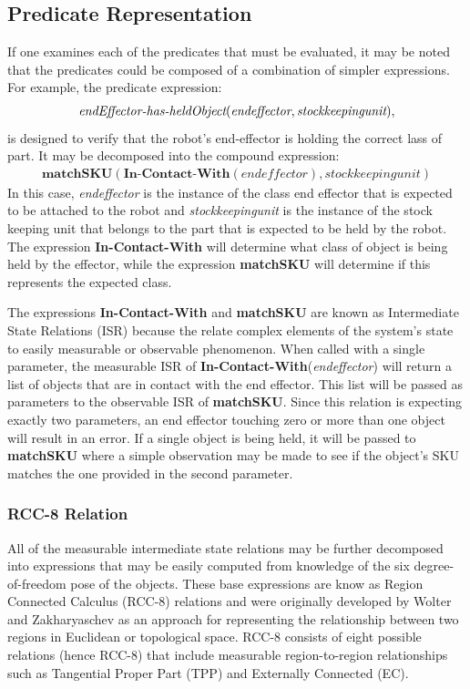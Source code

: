 \subsection{Predicate Representation}
If one examines each of the predicates that must be evaluated, it may be
noted that the predicates could be composed of a combination of simpler 
expressions. For example, the predicate expression:
\begin{gather} 
\textit{endEffector-has-heldObject}(\textit{endeffector}, 
\textit{stockkeepingunit}),
\label{equation:endEffector-has-heldObject}
\end{gather}
is designed to verify that the robot's end-effector is holding the correct lass of part. It may be decomposed into the compound expression: 
\begin{gather}
\textbf{matchSKU}(\textbf{In-Contact-With}(\textit{endeffector}), stockkeepingunit)
\label{equation:matchSKU}
\end{gather}
In this case, \textit{endeffector} is the instance of the class end effector
that is expected to be attached to the robot
and 
\textit{stockkeepingunit} is the instance of the stock keeping unit
that belongs to the part that is expected to be held by the robot.
The expression \textbf{In-Contact-With} will determine what class of object is being held by the effector, while the expression \textbf{matchSKU} will determine if this represents the expected class.
 
The expressions \textbf{In-Contact-With} and \textbf{matchSKU}
are known as Intermediate State Relations (ISR) because the relate
complex elements of the system's state to easily measurable or
observable phenomenon. When called with a single parameter,
the measurable ISR of 
\textbf{In-Contact-With}(\textit{endeffector}) will return
a list of objects that are in contact with the end effector. 
This list will be passed as parameters to the observable
ISR of \textbf{matchSKU}. Since this relation is
expecting exactly two parameters, an end effector touching
zero or more than one object will result in an error. If a
single object is being held, it will be passed to \textbf{matchSKU} where
a simple observation may be made to see if the object's SKU
matches the one provided in the second parameter.

\subsubsection{RCC-8 Relation}
All of the measurable intermediate state relations may be further
decomposed into expressions that may be easily computed from
knowledge of the six degree-of-freedom pose of the objects. 
These base expressions are know
as Region Connected Calculus (RCC-8) relations and were originally
developed by Wolter and Zakharyaschev \cite{Wolter2000} 
as an approach for representing the relationship between two regions in 
Euclidean or topological space. 
RCC-8 consists of eight possible relations (hence RCC-8) that include
measurable region-to-region relationships such as
Tangential Proper Part (TPP) and Externally Connected (EC). 

